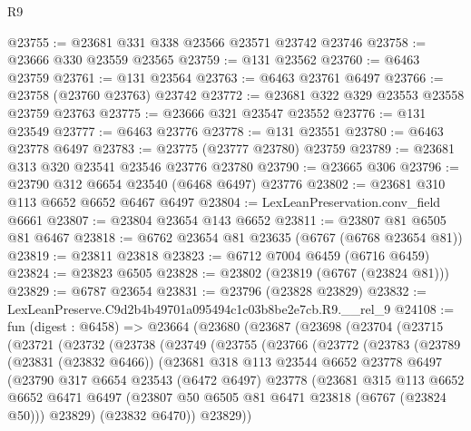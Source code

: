 \begin{lexlean}{R9}
\begin{coremodule}
@23755 := @23681 @331 @338 @23566 @23571 @23742 @23746
@23758 := @23666 @330 @23559 @23565
@23759 := @131 @23562
@23760 := @6463 @23759
@23761 := @131 @23564
@23763 := @6463 @23761 @6497
@23766 := @23758 (@23760 @23763) @23742
@23772 := @23681 @322 @329 @23553 @23558 @23759 @23763
@23775 := @23666 @321 @23547 @23552
@23776 := @131 @23549
@23777 := @6463 @23776
@23778 := @131 @23551
@23780 := @6463 @23778 @6497
@23783 := @23775 (@23777 @23780) @23759
@23789 := @23681 @313 @320 @23541 @23546 @23776 @23780
@23790 := @23665 @306
@23796 := @23790 @312 @6654 @23540 (@6468 @6497) @23776
@23802 := @23681 @310 @113 @6652 @6652 @6467 @6497
@23804 := LexLeanPreservation.conv_field @6661
@23807 := @23804 @23654 @143 @6652
@23811 := @23807 @81 @6505 @81 @6467
@23818 := @6762 @23654 @81 @23635 (@6767 (@6768 @23654 @81))
@23819 := @23811 @23818
@23823 := @6712 @7004 @6459 (@6716 @6459)
@23824 := @23823 @6505
@23828 := @23802 (@23819 (@6767 (@23824 @81)))
@23829 := @6787 @23654
@23831 := @23796 (@23828 @23829)
@23832 := LexLeanPreserve.C9d2b4b49701a095494c1c03b8be2e7cb.R9.__rel_9
@24108 := fun (digest : @6458) =>
  @23664
    (@23680
      (@23687
        (@23698
          (@23704
            (@23715
              (@23721
                (@23732
                  (@23738
                    (@23749
                      (@23755
                        (@23766
                          (@23772
                            (@23783
                              (@23789
                                (@23831 (@23832 @6466))
                                (@23681
                                  @318
                                  @113
                                  @23544
                                  @6652
                                  @23778
                                  @6497
                                  (@23790
                                    @317
                                    @6654
                                    @23543
                                    (@6472 @6497)
                                    @23778
                                    (@23681
                                      @315
                                      @113
                                      @6652
                                      @6652
                                      @6471
                                      @6497
                                      (@23807 @50 @6505 @81 @6471 @23818 (@6767 (@23824 @50)))
                                      @23829)
                                    (@23832 @6470))
                                  @23829))

\end{coremodule}
\end{lexlean}
